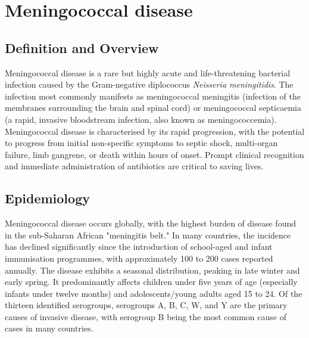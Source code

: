 \chapter{Meningococcal disease}

\section*{Definition and Overview}
Meningococcal disease is a rare but highly acute and life-threatening bacterial infection caused by the Gram-negative diplococcus \textit{Neisseria meningitidis}. The infection most commonly manifests as meningococcal meningitis (infection of the membranes surrounding the brain and spinal cord) or meningococcal septicaemia (a rapid, invasive bloodstream infection, also known as meningococcemia). Meningococcal disease is characterised by its rapid progression, with the potential to progress from initial non-specific symptoms to septic shock, multi-organ failure, limb gangrene, or death within hours of onset. Prompt clinical recognition and immediate administration of antibiotics are critical to saving lives.

\section*{Epidemiology}
Meningococcal disease occurs globally, with the highest burden of disease found in the sub-Saharan African "meningitis belt." In many countries, the incidence has declined significantly since the introduction of school-aged and infant immunisation programmes, with approximately 100 to 200 cases reported annually. The disease exhibits a seasonal distribution, peaking in late winter and early spring. It predominantly affects children under five years of age (especially infants under twelve months) and adolescents/young adults aged 15 to 24. Of the thirteen identified serogroups, serogroups A, B, C, W, and Y are the primary causes of invasive disease, with serogroup B being the most common cause of cases in many countries.

